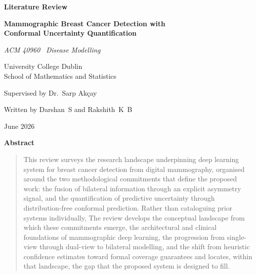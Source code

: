 \documentclass[12pt, a4paper]{article}
\renewenvironment{abstract}{%
  \begin{center}\textbf{Abstract}\end{center}%
  \begin{quotation}%
}{\end{quotation}}
\begin{document}
\begin{titlepage}
  \centering
  \vspace*{3cm}

  {\LARGE\bfseries Literature Review\par}
  \vspace{1.2cm}

  {\large\bfseries
    Mammographic Breast Cancer Detection with\\
    Conformal Uncertainty Quantification\par}
  \vspace{1.8cm}

  {\normalsize\itshape ACM 40960 \textperiodcentered\ Disease Modelling\par}
  \vspace{0.6cm}

  {\normalsize University College Dublin\\
  School of Mathematics and Statistics\par}
  \vspace{0.6cm}

  {\normalsize Supervised by Dr.\ Sarp Ak{\c{c}}ay\par}
  \vspace{0.6cm}

  {\normalsize Written by Darshan\ S and Rakshith\ K\ B\par}
  \vspace{0.6cm}
  {\normalsize June 2026\par}
\end{titlepage}

\begin{abstract}
This review surveys the research landscape underpinning deep learning
system for breast cancer detection from digital mammography, organised
around the two methodological commitments that define the proposed work:
the fusion of bilateral information through an explicit asymmetry signal,
and the quantification of predictive uncertainty through distribution-free
conformal prediction. Rather than cataloguing prior systems individually,
The review develops the conceptual landscape from which these commitments
emerge, the architectural and clinical foundations of mammographic deep
learning, the progression from single-view through dual-view to bilateral
modelling, and the shift from heuristic confidence estimates toward formal
coverage guarantees and locates, within that landscape, the gap that the 
proposed system is designed to fill.
\end{abstract}
\end{document}
